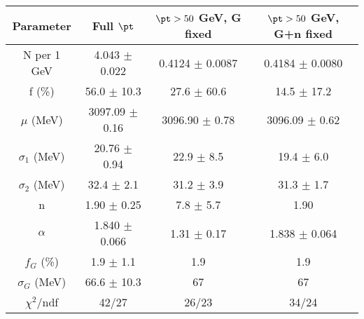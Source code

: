 \begin{tabular}{c||c|c|c}
Parameter & Full $\pt$ & $\pt>50$ GeV, G fixed & $\pt>50$ GeV, G+n fixed \\
\hline
N per 1 GeV & 4.043 $\pm$ 0.022 & 0.4124 $\pm$ 0.0087 & 0.4184 $\pm$ 0.0080\\
f (\%) & 56.0 $\pm$ 10.3 & 27.6 $\pm$ 60.6 & 14.5 $\pm$ 17.2\\
$\mu$ (MeV) & 3097.09 $\pm$ 0.16 & 3096.90 $\pm$ 0.78 & 3096.09 $\pm$ 0.62\\
$\sigma_1$ (MeV) & 20.76 $\pm$ 0.94 & 22.9 $\pm$ 8.5 & 19.4 $\pm$ 6.0\\
$\sigma_2$ (MeV) & 32.4 $\pm$ 2.1 & 31.2 $\pm$ 3.9 & 31.3 $\pm$ 1.7\\
n & 1.90 $\pm$ 0.25 & 7.8 $\pm$ 5.7 & 1.90\\
$\alpha$ & 1.840 $\pm$ 0.066 & 1.31 $\pm$ 0.17 & 1.838 $\pm$ 0.064\\
$f_G$ (\%) & 1.9 $\pm$ 1.1 & 1.9 & 1.9\\
$\sigma_G$ (MeV) & 66.6 $\pm$ 10.3 & 67 & 67\\
\hline
$\chi^2$/ndf & 42/27 & 26/23 & 34/24\\
\end{tabular}
